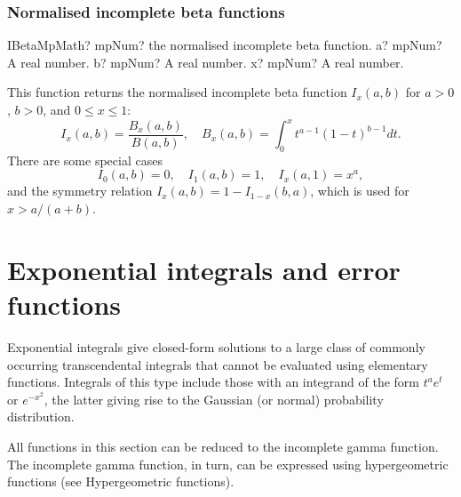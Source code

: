 \subsection{Normalised incomplete beta functions}
\label{sec:IncompleteBetaFunction}


\begin{mpFunctionsExtract}
	\mpFunctionThreeNotImplemented
	{IBetaMpMath? mpNum? the normalised incomplete beta function.}
	{a? mpNum? A real number.}
	{b? mpNum? A real number.}
	{x? mpNum? A real number.}
\end{mpFunctionsExtract}

\vspace{0.3cm}
This function returns the normalised incomplete beta function $I_x(a,b)$ for $a>0$, $b>0$, and $0 \leq x \leq 1$:
\begin{equation}
	I_x(a,b) = \frac{B_x(a,b)}{B(a,b)}, \quad B_x(a,b) = \int_0^x t^{a-1} (1-t)^{b-1} dt.
\end{equation}
There are some special cases
\begin{equation}
	I_0(a,b)=0, \quad I_1(a,b)=1, \quad I_x(a,1)=x^a,
\end{equation}
and the symmetry relation $I_x(a,b)=1-I_{1-x}(b,a)$, which is used for $x>a/(a+b)$.







\newpage
\chapter{Exponential integrals and error functions}
Exponential integrals give closed-form solutions to a large class of commonly occurring transcendental integrals that cannot be evaluated using elementary functions. Integrals of this type include those with an integrand of the form $t^a e^t$ or $e^{-x^2}$, the latter giving rise to the Gaussian (or normal) probability distribution.

All functions in this section can be reduced to the  incomplete gamma function. The incomplete gamma function, in turn, can be expressed using hypergeometric functions (see Hypergeometric functions).

